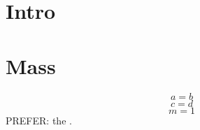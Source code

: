 \documentclass{article}
\begin{document}
\section{Intro}
\section{Mass}\label{mass}
\begin{equation} a=b \end{equation}
\begin{equation} c=d \end{equation}
\begin{equation} m=1 \label{eq:mass} \end{equation}
PREFER: the .
\end{document}
